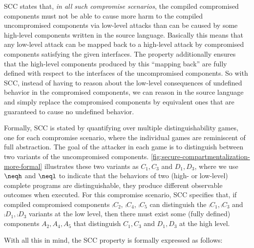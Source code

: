 \documentclass[10pt, conference, compsocconf, letterpaper, times]{IEEEtran}
\begin{document}
SCC states that, \emph{in all such
  compromise scenarios}, the compiled compromised components must not be
able to cause more harm to the compiled uncompromised components via
low-level attacks than can be caused by some high-level components written
in the source language.
Basically this means that any low-level attack can
be mapped back to a high-level attack by compromised components satisfying
the given interfaces.
\iffull
{}\fi
The property additionally ensures that the high-level components
produced by this ``mapping back'' are fully defined with respect to
the interfaces of the uncompromised components.
So with SCC,
instead of having to reason about the low-level consequences of
undefined behavior in the compromised components, we can
reason in the source language and simply replace the compromised
components by equivalent ones that are guaranteed to
cause no undefined behavior.

Formally, SCC is stated by quantifying over multiple
distinguishability games, one for each
compromise scenario, where the individual games are reminiscent of full
abstraction.
The goal of the attacker in each game is to distinguish between two
variants of the uncompromised components.
\autoref{fig:secure-compartmentalization-more-formal} illustrates
these two variants as $C_1, C_3$ and $D_1, D_3$, where we use $\neqh$ and
$\neql$ to indicate that the behaviors of two (high- or
low-level) complete programs are distinguishable, \IE they produce
different observable outcomes when executed.
For this compromise scenario, SCC specifies that,
if compiled compromised components $\comp{C_2}$, $\comp{C_4}$,
$\comp{C_5}$ can distinguish the $\comp{C_1},\comp{C_3}$ and
$\comp{D_1},\comp{D_3}$ variants at the low 
level, then 
there must exist some (fully defined) components $A_2, A_4, A_5$
that distinguish ${C_1},{C_3}$ and ${D_1},{D_3}$ at
the high level.

With all this in mind, the SCC property is
formally\ifsooner{}\fi{}
expressed as follows:
\end{document}
